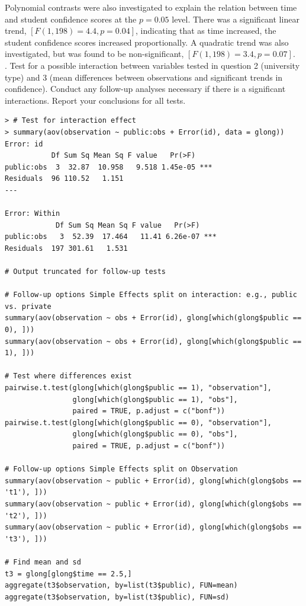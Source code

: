 \documentclass[onecolumn,10pt]{jhwhw}
\begin{document}
Polynomial contrasts were also investigated to explain the relation between time and student confidence scores at the $p=0.05$ level. There was a significant linear trend, $[F(1, 198) = 4.4, p = 0.04]$, indicating that as time increased, the student confidence scores increased proportionally. A quadratic trend was also investigated, but was found to be non-significant, $[F(1, 198) = 3.4, p = 0.07]$.\\

. Test for a possible interaction between variables tested in question 2 (university type) and 3 (mean differences between observations and significant trends in confidence). Conduct any follow-up analyses necessary if there is a significant interactions. Report your conclusions for all tests.

\begin{lstlisting}
> # Test for interaction effect
> summary(aov(observation ~ public:obs + Error(id), data = glong))
Error: id
           Df Sum Sq Mean Sq F value   Pr(>F)
public:obs  3  32.87  10.958   9.518 1.45e-05 ***
Residuals  96 110.52   1.151
---

Error: Within
            Df Sum Sq Mean Sq F value   Pr(>F)
public:obs   3  52.39  17.464   11.41 6.26e-07 ***
Residuals  197 301.61   1.531

# Output truncated for follow-up tests

# Follow-up options Simple Effects split on interaction: e.g., public vs. private
summary(aov(observation ~ obs + Error(id), glong[which(glong$public == 0), ]))
summary(aov(observation ~ obs + Error(id), glong[which(glong$public == 1), ]))

# Test where differences exist
pairwise.t.test(glong[which(glong$public == 1), "observation"],
                glong[which(glong$public == 1), "obs"],
                paired = TRUE, p.adjust = c("bonf"))
pairwise.t.test(glong[which(glong$public == 0), "observation"],
                glong[which(glong$public == 0), "obs"],
                paired = TRUE, p.adjust = c("bonf"))

# Follow-up options Simple Effects split on Observation
summary(aov(observation ~ public + Error(id), glong[which(glong$obs == 't1'), ]))
summary(aov(observation ~ public + Error(id), glong[which(glong$obs == 't2'), ]))
summary(aov(observation ~ public + Error(id), glong[which(glong$obs == 't3'), ]))

# Find mean and sd
t3 = glong[glong$time == 2.5,]
aggregate(t3$observation, by=list(t3$public), FUN=mean)
aggregate(t3$observation, by=list(t3$public), FUN=sd)
\end{lstlisting}
\end{document}
